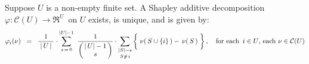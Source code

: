 \begin{theorem}
\label{theorem:ShapleyDecompositionExistenceUniqueness}
\mbox{}
\vskip 0.1cm
\noindent
Suppose $U$ is a non-empty finite set.
A Shapley additive decomposition
\,$\varphi : \mathcal{C}(U) \longrightarrow \Re^{U}$\,
on $U$ exists, is unique, and is given by:
\begin{equation*}
\varphi_{i}(\nu)
\;\; = \;\;
	\dfrac{1}{{\color{white}.}\vert\, U \,\vert{\color{white}.}}
	\cdot
	\overset{\vert U \vert-1}{\underset{s\,=\,0}{\sum}}\;\;
	\dfrac{1}{\left(\!\!\begin{array}{c} \vert\,U \vert-1 \\ s \end{array}\!\!\right)}
	\cdot
	\underset{S \not\ni\,i}{\underset{\vert S \vert = s}{\sum}}
		\left\{\;
			\nu\!\left(\,S\cup\{i\}\,\right) \overset{{\color{white}1}}{-}\, \nu\!\left(\,S\,\right)
			\;\right\},
\quad
\textnormal{for each \,$i \in U$, each $\nu \in \mathcal{C}(U)$}
\end{equation*}
\end{theorem}


\renewcommand{\theenumi}{\roman{enumi}}
\renewcommand{\labelenumi}{\textnormal{(\theenumi)}$\;\;$}

